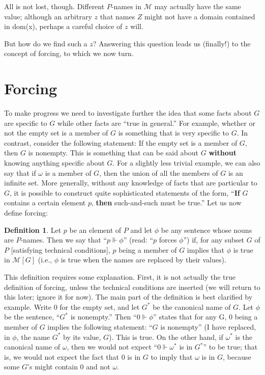 \documentclass[10pt]{article}
\theoremstyle{definition}
\newtheorem*{defn}{Definition}
\begin{document}
All is not lost, though. Different $P$-names in $\mathcal M$ may actually have the same value; although an arbitrary $z$ that names $Z$ might not have a domain contained in dom(x), perhaps a careful choice of $z$ will.

But how do we find such a $z$? Answering this question leads us (finally!) to the concept of forcing, to which we now turn.


\section{Forcing}

To make progress we need to investigate further the idea that some facts about $G$ are specific to $G$ while other facts are ``true in general.'' For example, whether or not the empty set is a member of $G$ is something that is very specific to $G$. In contrast, consider the following statement: If the empty set is a member of $G$, then $G$ is nonempty. This is something that can be said about $G$ \textbf{without} knowing anything specific about $G$. For a slightly less trivial example, we can also say that if $\omega$ is a member of $G$, then the union of all the members of $G$ is an infinite set. More generally, without any knowledge of facts that are particular to $G$, it is possible to construct quite sophisticated statements of the form, ``\textbf{If} $G$ contains a certain element $p$, \textbf{then} such-and-such must be true.'' Let us now define forcing:

\begin{defn}
Let $p$ be an element of $P$ and let $\phi$ be any sentence whose nouns are $P$-names. Then we say that ``$p \Vdash \phi$'' (read: ``$p$ forces $\phi$'') if, for any subset $G$ of $P$ [satisfying technical conditions], $p$ being a member of $G$ implies that $\phi$ is true in $\mathcal M[G]$ (i.e., $\phi$ is true when the names are replaced by their values).
\end{defn}

This definition requires some explanation. First, it is not actually the true definition of forcing, unless the technical conditions are inserted (we will return to this later; ignore it for now). The main part of the definition is best clarified by example. Write $0$ for the empty set, and let $G^*$ be the canonical name of $G$. Let $\phi$ be the sentence, ``$G^*$ is nonempty.'' Then ``$0 \Vdash \phi$'' states that for any G, 0 being a member of $G$ implies the following statement: ``$G$ is nonempty'' (I have replaced, in $\phi$, the name $G^*$ by its value, $G$). This is true. On the other hand, if $\omega^*$ is the canonical name of $\omega$, then we would not expect ``$0 \Vdash \omega^*$ is in $G^*$'' to be true; that is, we would not expect the fact that $0$ is in $G$ to imply that $\omega$ is in $G$, because some $G$'s might contain $0$ and not $\omega$.
\end{document}
